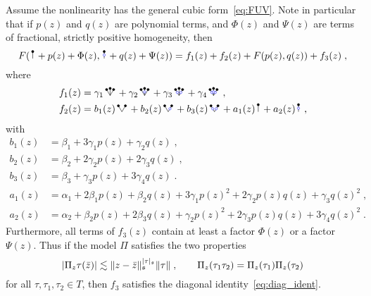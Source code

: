 \documentclass[reqno,11pt]{article}
\def\fraks{\mathfrak{s}}
\def\abss#1{\abs{#1}_\mathfrak{s}}
\begin{document}
Assume the nonlinearity has the general cubic form~\eqref{eq:FUV}.
Note in particular that if $p(z)$ and $q(z)$ are polynomial terms, and 
$\Phi(z)$ and $\Psi(z)$ are terms of fractional, strictly positive 
homogeneity, then 
\begin{equation}
 F(\RSI + p(z) + \Phi(z), \RSoI + q(z) + \Psi(z)) 
 = f_1(z) + f_2(z) + F(p(z), q(z)) + f_3(z)\;,
\label{eq:FUV1} 
\end{equation} 
where 
\begin{align}
\nonumber
f_1(z) &= \gamma_1 \RSW + \gamma_2\RSWo + \gamma_3\RSWoo + \gamma_4\RSWooo\;,
\\
f_2(z) &= b_1(z) \RSV + b_2(z) \RSVo + b_3(z) \RSVoo 
+ a_1(z) \RSI + a_2(z) \RSoI\;, 
\end{align}
with 
\begin{align}
\nonumber
b_1(z) &= \beta_1 + 3\gamma_1p(z) +  \gamma_2q(z)\;, \\
\nonumber
b_2(z) &= \beta_2 + 2\gamma_2p(z) + 2\gamma_3q(z)\;, \\
\nonumber
b_3(z) &= \beta_3 +  \gamma_3p(z) + 3\gamma_4q(z)\;. \\
\nonumber
a_1(z) &= \alpha_1 + 2\beta_1p(z) + \beta_2q(z) +
3\gamma_1p(z)^2 +2\gamma_2p(z)q(z) + \gamma_3q(z)^2\;, \\
a_2(z) &= \alpha_2 + \beta_2p(z) + 2\beta_3q(z) +
\gamma_2p(z)^2 +2\gamma_3p(z)q(z) + 3\gamma_4q(z)^2\;.
\label{eq:bc} 
\end{align}
Furthermore, all terms of $f_3(z)$ contain at least a factor $\Phi(z)$ or a 
factor $\Psi(z)$. Thus if the model $\Pi$ satisfies the two properties 
\begin{equation}
\label{eq:model_canonical} 
 \abs{\Pi_z\tau(\bar z)} \lesssim \norm{z-\bar 
z}_\fraks^{\abss{\tau}}\norm{\tau}\;, 
\qquad
\Pi_z(\tau_1\tau_2) = \Pi_z(\tau_1) \Pi_z(\tau_2)
\end{equation} 
for all $\tau,\tau_1,\tau_2\in T$, then $f_3$ satisfies the diagonal 
identity~\eqref{eq:diag_ident}. 
\end{document}
